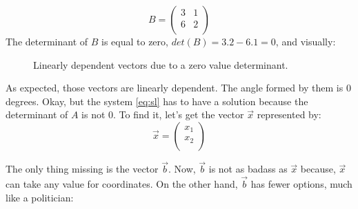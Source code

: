 \documentclass[a4,12pt,twosided,openany]{memoir}
\begin{document}
\[B = 
\begin{pmatrix}
3 & 1 \\
6 & 2 \\
\end{pmatrix}
\]
\indent
The determinant of $B$ is equal to zero, $det(B)=3.2−6.1=0$, and visually:
\begin{figure}[h!]
\begin{center}
\end{center}
\caption{Linearly dependent vectors due to a zero value determinant.}
\end{figure}
\par 
\indent
As expected, those vectors are linearly dependent. The angle formed by them is 0 degrees. Okay, but the system \ref{eq:sl} has to have a solution because the determinant of $A$ is not 0. To find it, let’s get the vector $\overrightarrow{x}$ represented by:
\[\overrightarrow{x} =  \begin{pmatrix}
x_1 \\
x_2  \\
\end{pmatrix} \]
\par 
\indent
The only thing missing is the vector $\overrightarrow{b}$. Now, $\overrightarrow{b}$ is not as badass as $\overrightarrow{x}$ because, $\overrightarrow{x}$ can take any value for coordinates. On the other hand, $\overrightarrow{b}$ has fewer options, much like a politician:
\end{document}
